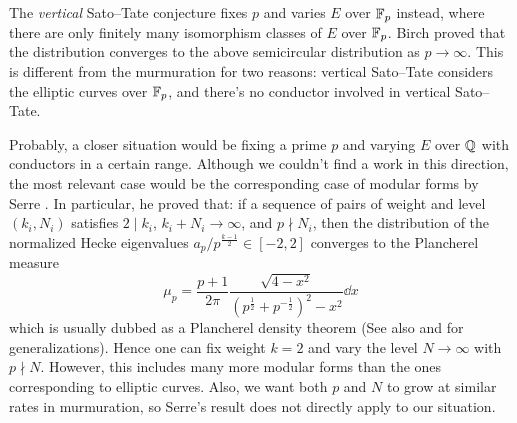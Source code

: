 The \emph{vertical} Sato--Tate conjecture fixes $p$ and varies $E$ over $\mathbb{F}_p$ instead, where there are only finitely many isomorphism classes of $E$ over $\mathbb{F}_p$.
Birch \cite{birch1968number} proved that the distribution converges to the above semicircular distribution as $p \to \infty$.
This is different from the murmuration for two reasons: vertical Sato--Tate considers the elliptic curves over $\mathbb{F}_p$, and there's no conductor involved in vertical Sato--Tate.

Probably, a closer situation would be fixing a prime $p$ and varying $E$ over $\mathbb{Q}$ with conductors in a certain range.
Although we couldn't find a work in this direction, the most relevant case would be the corresponding case of modular forms by Serre \cite{serre1997repartition}.
In particular, he proved that: if a sequence of pairs of weight and level $(k_i, N_i)$ satisfies $2 \mid k_i$, $k_i + N_i \to \infty$, and $p \nmid N_i$, then the distribution of the normalized Hecke eigenvalues $a_p / p^{\frac{k-1}{2}} \in [-2, 2]$ converges to the Plancherel measure
\[
\mu_p = \frac{p+1}{2\pi} \frac{\sqrt{4 - x^2}}{(p^{\frac{1}{2}} + p^{-\frac{1}{2}})^2 - x^2} \dd x
\]
which is usually dubbed as a Plancherel density theorem (See also \cite{shin2012automorphic} and \cite{shin2016sato} for generalizations).
Hence one can fix weight $k = 2$ and vary the level $N \to \infty$ with $p \nmid N$.
However, this includes many more modular forms than the ones corresponding to elliptic curves.
Also, we want both $p$ and $N$ to grow at similar rates in murmuration, so Serre's result does not directly apply to our situation.